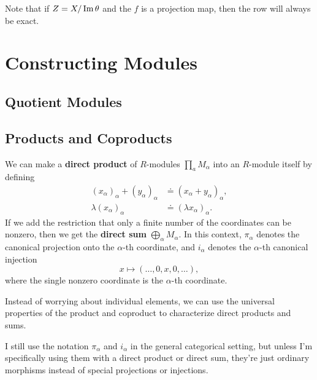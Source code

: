 \documentclass[twoside,10pt]{report}
\begin{document}
Note that if $Z = X / \operatorname{Im} \theta$ and the $f$ is a projection map, then the row will always be exact.




\chapter{Constructing Modules}

\section{Quotient Modules}


\section{Products and Coproducts}

We can make a \textbf{direct product} of $R$-modules $\prod_{a}M_{\alpha}$ into an $R$-module itself by defining
\begin{align*}
	(x_{\alpha})_{\alpha} + (y_{\alpha})_{\alpha} &\doteq (x_{\alpha} + y_{\alpha})_{\alpha}, \\
	\lambda (x_{\alpha})_{\alpha} &\doteq (\lambda x_{\alpha})_{\alpha}.
\end{align*}
If we add the restriction that only a finite number of the coordinates can be nonzero, then we get the \textbf{direct sum} $\bigoplus_{\alpha} M_{\alpha}$. In this context, $\pi_{\alpha}$ denotes the canonical projection onto the $\alpha$-th coordinate, and $i_{\alpha}$ denotes the $\alpha$-th canonical injection
\[
	x \mapsto (\dots, 0, x, 0, \dots),
\] where the single nonzero coordinate is the $\alpha$-th coordinate.

Instead of worrying about individual elements, we can use the universal properties of the product and coproduct to characterize direct products and sums.

\begin{note}[]
I still use the notation $\pi_{\alpha}$ and $i_{\alpha}$ in the general categorical setting, but unless I'm specifically using them with a direct product or direct sum, they're just ordinary morphisms instead of special projections or injections.
\end{note}
\end{document}
